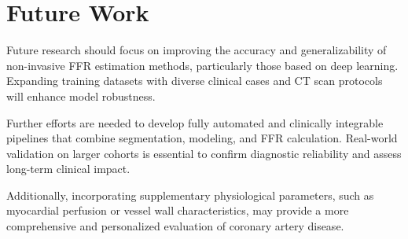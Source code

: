 \documentclass[default]{subfiles}
\begin{document}
\section{Future Work}

Future research should focus on improving the accuracy and generalizability of non-invasive FFR estimation methods,
particularly those based on deep learning. Expanding training datasets with diverse clinical cases and CT scan
protocols will enhance model robustness.

Further efforts are needed to develop fully automated and clinically integrable pipelines that combine segmentation,
modeling, and FFR calculation. Real-world validation on larger cohorts is essential to confirm diagnostic reliability
and assess long-term clinical impact.

Additionally, incorporating supplementary physiological parameters, such as myocardial perfusion or vessel wall
characteristics, may provide a more comprehensive and personalized evaluation of coronary artery disease.

\putbib[cite]

\makealttitle
\end{document}

